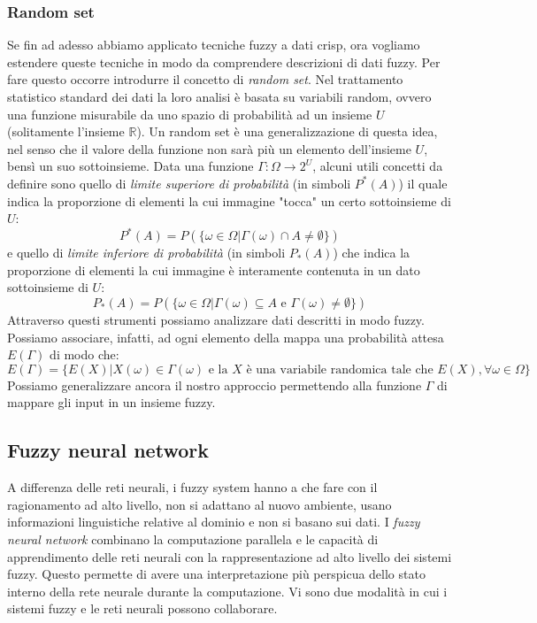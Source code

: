 \documentclass[10pt,a4paper]{article}
\begin{document}
\subsubsection{Random set}

Se fin ad adesso abbiamo applicato tecniche fuzzy a dati crisp, ora vogliamo estendere queste tecniche in modo da comprendere descrizioni di dati fuzzy. Per fare questo occorre introdurre il concetto di \emph{random set}. Nel trattamento statistico standard dei dati la loro analisi è basata su variabili random, ovvero una funzione misurabile da uno spazio di probabilità ad un insieme $U$ (solitamente l'insieme $\mathbb{R}$). Un random set è una generalizzazione di questa idea, nel senso che il valore della funzione non sarà più un elemento dell'insieme $U$, bensì un suo sottoinsieme. Data una funzione $\Gamma: \Omega \to 2^U$, alcuni utili concetti da definire sono quello di \emph{limite superiore di probabilità} (in simboli $P^*(A)$) il quale indica la proporzione di elementi la cui immagine "tocca" un certo sottoinsieme di $U$:
$$
P^*(A) = P(\{ \omega \in \Omega | \Gamma (\omega) \cap A \neq \emptyset \})
$$
e quello di \emph{limite inferiore di probabilità} (in simboli $P_*(A)$) che indica la proporzione di elementi la cui immagine è interamente contenuta in un dato sottoinsieme di $U$:
$$
P_*(A) = P(\{ \omega \in \Omega | \Gamma (\omega) \subseteq A \text{ e } \Gamma(\omega) \neq \emptyset \})
$$
Attraverso questi strumenti possiamo analizzare dati descritti in modo fuzzy. Possiamo associare, infatti, ad ogni elemento della mappa una probabilità attesa $E(\Gamma)$ di modo che:
$$
E(\Gamma) = \{ E(X) | X(\omega) \in \Gamma(\omega) \text{ e la } X \text{ è una variabile randomica tale che } E(X), \forall \omega \in \Omega \}
$$
Possiamo generalizzare ancora il nostro approccio permettendo alla funzione $\Gamma$ di mappare gli input in un insieme fuzzy.

\subsection{Fuzzy neural network}

A differenza delle reti neurali, i fuzzy system hanno a che fare con il ragionamento ad alto livello, non si adattano al nuovo ambiente, usano informazioni linguistiche relative al dominio e non si basano sui dati. I \emph{fuzzy neural network} combinano la computazione parallela e le capacità di apprendimento delle reti neurali con la rappresentazione ad alto livello dei sistemi fuzzy. Questo permette di avere una interpretazione più perspicua dello stato interno della rete neurale durante la computazione. Vi sono due modalità in cui i sistemi fuzzy e le reti neurali possono collaborare.
\end{document}
